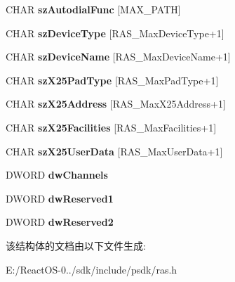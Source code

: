 \begin{DoxyCompactItemize}
C\+H\+AR {\bfseries sz\+Autodial\+Func} \mbox{[}M\+A\+X\+\_\+\+P\+A\+TH\mbox{]}
\item 
\mbox{\label{structtag_r_a_s_e_n_t_r_y_a_aca4847485f2d5142cf010560aa03c8cf}} 
C\+H\+AR {\bfseries sz\+Device\+Type} \mbox{[}R\+A\+S\+\_\+\+Max\+Device\+Type+1\mbox{]}
\item 
\mbox{\label{structtag_r_a_s_e_n_t_r_y_a_acdc5d8639d0fb2d3a184975835c854db}} 
C\+H\+AR {\bfseries sz\+Device\+Name} \mbox{[}R\+A\+S\+\_\+\+Max\+Device\+Name+1\mbox{]}
\item 
\mbox{\label{structtag_r_a_s_e_n_t_r_y_a_adf8142161b845b85de47c5e1d4af8396}} 
C\+H\+AR {\bfseries sz\+X25\+Pad\+Type} \mbox{[}R\+A\+S\+\_\+\+Max\+Pad\+Type+1\mbox{]}
\item 
\mbox{\label{structtag_r_a_s_e_n_t_r_y_a_af340d93a14c9fcf8408e3e44c71fa21b}} 
C\+H\+AR {\bfseries sz\+X25\+Address} \mbox{[}R\+A\+S\+\_\+\+Max\+X25\+Address+1\mbox{]}
\item 
\mbox{\label{structtag_r_a_s_e_n_t_r_y_a_a8ace33f53372190454053d27430c5469}} 
C\+H\+AR {\bfseries sz\+X25\+Facilities} \mbox{[}R\+A\+S\+\_\+\+Max\+Facilities+1\mbox{]}
\item 
\mbox{\label{structtag_r_a_s_e_n_t_r_y_a_a762e0f31f50be1df23d26774ec61bf24}} 
C\+H\+AR {\bfseries sz\+X25\+User\+Data} \mbox{[}R\+A\+S\+\_\+\+Max\+User\+Data+1\mbox{]}
\item 
\mbox{\label{structtag_r_a_s_e_n_t_r_y_a_acd6989f5a82ae3219258b022f9a1fedd}} 
D\+W\+O\+RD {\bfseries dw\+Channels}
\item 
\mbox{\label{structtag_r_a_s_e_n_t_r_y_a_a6396be083226e2938359959a19b28730}} 
D\+W\+O\+RD {\bfseries dw\+Reserved1}
\item 
\mbox{\label{structtag_r_a_s_e_n_t_r_y_a_ac084c3f116725c9357b97a7caff9ec61}} 
D\+W\+O\+RD {\bfseries dw\+Reserved2}
\end{DoxyCompactItemize}


该结构体的文档由以下文件生成\+:\begin{DoxyCompactItemize}
\item 
E\+:/\+React\+O\+S-\/0../sdk/include/psdk/ras.\+h\end{DoxyCompactItemize}
